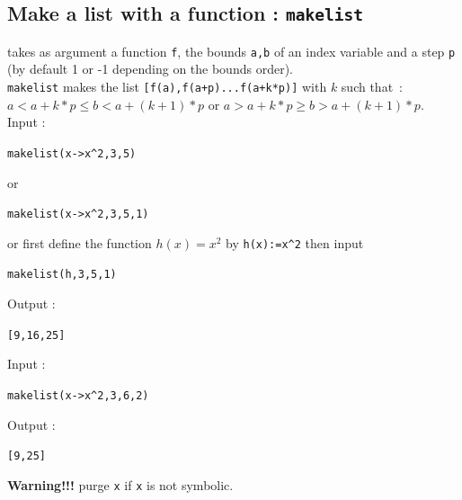 \documentclass[a4paper,11pt]{book}
\begin{document}
\subsection{Make a list with a function : {\tt makelist}}
 takes as argument a function {\tt f}, 
the bounds {\tt a,b} of an index variable and a step {\tt p} 
(by default 1 or -1 depending on the bounds order).\\ 
{\tt makelist} makes the list {\tt [f(a),f(a+p)...f(a+k*p)]} with $k$ such
that~: $a<a+k*p \leq b <a+(k+1)*p$ or $a>a+k*p \geq b >a+(k+1)*p$.\\
Input :
\begin{center}{\tt makelist(x->x\verb|^|2,3,5)}\end{center}
or
\begin{center}{\tt makelist(x->x\verb|^|2,3,5,1)}\end{center}
or first define the function $h(x)=x^2$ by {\tt h(x):=x\verb|^|2}
then input
\begin{center}{\tt makelist(h,3,5,1)}\end{center}
Output :
\begin{center}{\tt [9,16,25]}\end{center}
Input :
\begin{center}{\tt makelist(x->x\verb|^|2,3,6,2)}\end{center}
Output :
\begin{center}{\tt [9,25]}\end{center}
{\bf Warning!!!}  purge {\tt x} if {\tt x} is not symbolic.
\end{document}
